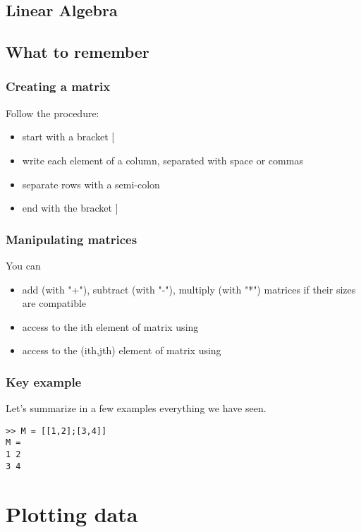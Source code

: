 \section{Linear Algebra}

\section{What to remember}
\subsection{Creating a matrix}
Follow the procedure:
\begin{itemize}
	\item start with a bracket [
	\item write each element of a column, separated with space or commas
	\item separate rows with a semi-colon
	\item end with the bracket ]
\end{itemize}

\subsection{Manipulating matrices}
You can
\begin{itemize}
	\item add (with "+"), subtract (with "-"), multiply (with "*") matrices if their sizes are compatible
	\item access to the ith element of matrix  using 
	\item access to the (ith,jth) element of matrix  using 
\end{itemize}	

\subsection{Key example}
Let's summarize in a few examples everything we have seen.

\begin{lstlisting}
>> M = [[1,2];[3,4]]
M = 
1 2 
3 4
\end{lstlisting}






\chapter{Plotting data}




